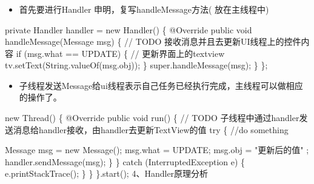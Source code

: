 \documentclass[9pt, b5paper]{article}
\begin{document}
\subsubsection{}
\label{sec-6-0-3}
\begin{itemize}
\item 首先要进行Handler 申明，复写handleMessage方法( 放在主线程中)
\end{itemize}
private Handler handler = new Handler() \{
        @Override
        public void handleMessage(Message msg) \{
            // TODO 接收消息并且去更新UI线程上的控件内容
            if (msg.what == UPDATE) \{
                // 更新界面上的textview
                tv.setText(String.valueOf(msg.obj));
            \}
            super.handleMessage(msg);
        \}
    \};
\begin{itemize}
\item 子线程发送Message给ui线程表示自己任务已经执行完成，主线程可以做相应的操作了。
\end{itemize}
new Thread() \{
            @Override
            public void run() \{
                // TODO 子线程中通过handler发送消息给handler接收，由handler去更新TextView的值
                try \{
                       //do something

                       Message msg = new Message();
                       msg.what = UPDATE;                    
                       msg.obj = "更新后的值" ;
                       handler.sendMessage(msg);
                   \}
               \} catch (InterruptedException e) \{
                   e.printStackTrace();
               \}
           \}
       \}.start();
4、Handler原理分析
\end{document}
